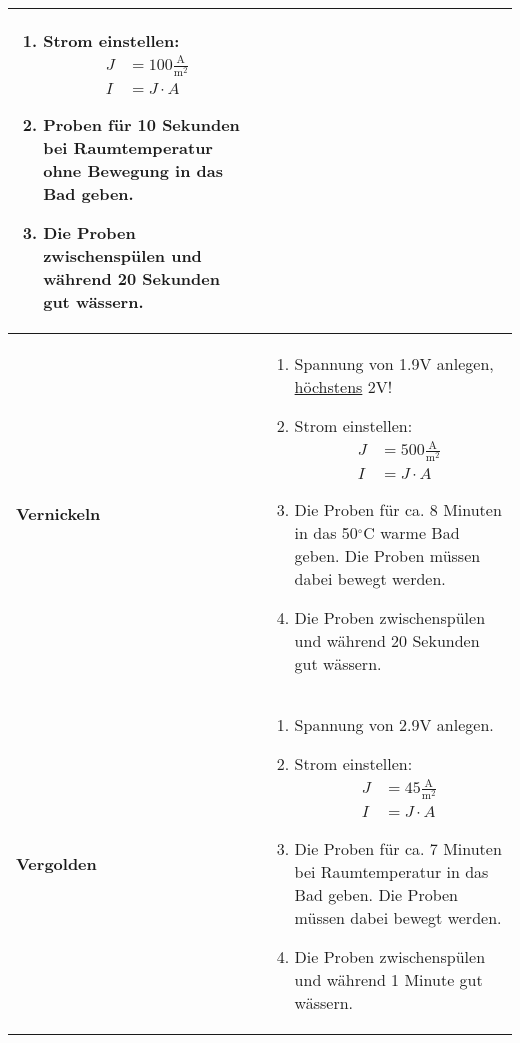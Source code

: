 \begin{longtable}{p{3cm}p{14cm}}
\begin{enumerate}
			\item Strom einstellen: 	$$\begin{aligned}
											J &= 100 \frac{\mathrm{A}}{\mathrm{m}^2}\\
											I &= J\cdot A
										\end{aligned}$$
			
			\item Proben für 10 Sekunden bei Raumtemperatur ohne Bewegung in das Bad geben.
			
			\item Die Proben zwischenspülen und während 20 Sekunden gut wässern.
		\end{enumerate}\\
	\hline
	\textbf{Vernickeln}
		&
		\begin{enumerate}
			\item Spannung von 1.9V anlegen, \underline{höchstens} 2V!
			
			\item Strom einstellen: 	$$\begin{aligned}
											J &= 500 \frac{\mathrm{A}}{\mathrm{m}^2}\\
											I &= J\cdot A
										\end{aligned}$$
										
			\item Die Proben für ca. 8 Minuten in das 50$^\circ$C warme Bad geben. Die Proben müssen dabei bewegt werden.
			
			\item Die Proben zwischenspülen und während 20 Sekunden gut wässern.
		\end{enumerate}\\
	\textbf{Vergolden}
		&
		\begin{enumerate}
			\item Spannung von 2.9V anlegen.
			
			\item Strom einstellen: 	$$\begin{aligned}
											J &= 45 \frac{\mathrm{A}}{\mathrm{m}^2}\\
											I &= J\cdot A
										\end{aligned}$$
										
			\item Die Proben für ca. 7 Minuten bei Raumtemperatur in das Bad geben. Die Proben müssen dabei bewegt werden.
			
			\item Die Proben zwischenspülen und während 1 Minute gut wässern.
			

\end{enumerate}
\end{longtable}
